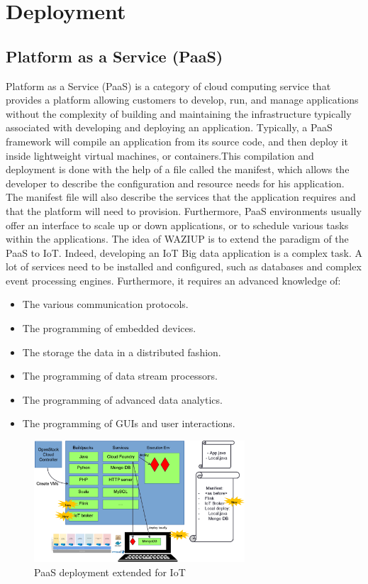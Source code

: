 

\section{Deployment}
\subsection{Platform as a Service (PaaS)}


Platform as a Service (PaaS) is a category of cloud computing service that provides a platform allowing customers to develop, run, and manage applications without the complexity of building and maintaining the infrastructure typically associated with developing and deploying an application.
Typically, a PaaS framework will compile an application from its source code, and then deploy it inside lightweight virtual machines, or containers.This compilation and deployment is done with the help of a file called the manifest, which allows the developer to describe the configuration and resource needs for his application.
The manifest file will also describe the services that the application requires and that the platform will need to provision.
Furthermore, PaaS environments usually offer an interface to scale up or down applications, or to schedule various tasks within the applications.
The idea of WAZIUP is to extend the paradigm of the PaaS to IoT.
Indeed, developing an IoT Big data application is a complex task.
A lot of services need to be installed and configured, such as databases and complex event processing engines.
Furthermore, it requires an advanced knowledge of:
\begin{itemize}
  \item The various communication protocols.
  \item The programming of embedded devices.
  \item The storage the data in a distributed fashion.
  \item The programming of data stream processors.
  \item The programming of advanced data analytics.
  \item The programming of GUIs and user interactions.
\end{itemize}

\begin{figure}[h!]
\centering
\includegraphics[width=0.7\textwidth]{figs/paas.png}
\caption{PaaS deployment extended for IoT}
\label{fig:paas}
\end{figure}

